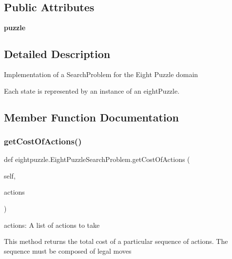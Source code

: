 \subsection*{Public Attributes}
\begin{DoxyCompactItemize}
\item 
\mbox{\label{classeightpuzzle_1_1_eight_puzzle_search_problem_ae16bdf2f41d837d6a79de5528d0b39b4}} 
{\bfseries puzzle}
\end{DoxyCompactItemize}


\subsection{Detailed Description}
\begin{DoxyVerb}  Implementation of a SearchProblem for the  Eight Puzzle domain

  Each state is represented by an instance of an eightPuzzle.
\end{DoxyVerb}
 

\subsection{Member Function Documentation}
\mbox{\label{classeightpuzzle_1_1_eight_puzzle_search_problem_ac2a259f6cf252108fb8560345f788614}} 
\subsubsection{\texorpdfstring{get\+Cost\+Of\+Actions()}{getCostOfActions()}}
{\footnotesize\ttfamily def eightpuzzle.\+Eight\+Puzzle\+Search\+Problem.\+get\+Cost\+Of\+Actions (\begin{DoxyParamCaption}\item[{}]{self,  }\item[{}]{actions }\end{DoxyParamCaption})}

\begin{DoxyVerb} actions: A list of actions to take

This method returns the total cost of a particular sequence of actions.  The sequence must
be composed of legal moves
\end{DoxyVerb}
 \mbox{\label{classeightpuzzle_1_1_eight_puzzle_search_problem_ac33cc3422f9a66bc0270ce43a79cf7c9}} 

